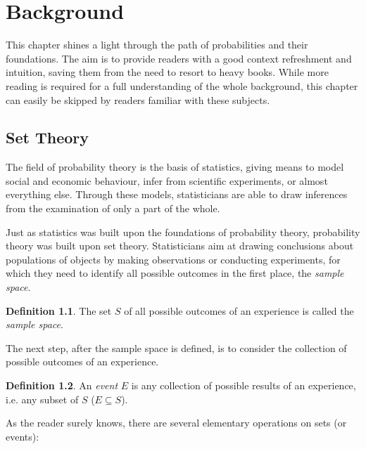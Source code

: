 \documentclass[
  oneside,
  11pt, a4paper,
  footinclude=true,
  headinclude=true,
  cleardoublepage=empty
]{scrbook}
\theoremstyle{definition}
\newtheorem{definition}{Definition}[section]
\theoremstyle{definition}
\begin{document}
    \chapter{Background}\label{ch-background}
    
        This chapter shines a light through the path of probabilities and their foundations. The aim is to provide readers with a good context refreshment and intuition, saving them from the need to resort to heavy books. While more reading is required for a full understanding of the whole background, this chapter can easily be skipped by readers familiar with these subjects.  
        
        \section{Set Theory}
        
            The field of probability theory is the basis of statistics, giving means to model social and economic behaviour, infer from scientific experiments, or almost everything else. Through these models, statisticians are able to draw inferences from the examination of only a part of the whole.
            
            Just as statistics was built upon the foundations of probability theory, probability theory was built upon set theory. Statisticians aim at drawing conclusions about populations of objects by making observations or conducting experiments, for which they need to identify all possible outcomes in the first place, the \emph{sample space}.
            
            \begin{definition}{}
                The set $S$ of all possible outcomes of an experience is called the \emph{sample space}.
            \end{definition}
            
            The next step, after the sample space is defined, is to consider the collection of possible outcomes of an experience.
            
            \begin{definition}{}
                An \emph{event} $E$ is any collection of possible results of an experience, i.e. any subset of $S$ ($E \subseteq S$).
            \end{definition}
            
            As the reader surely knows, there are several elementary operations on sets (or events):
            
\end{document}
